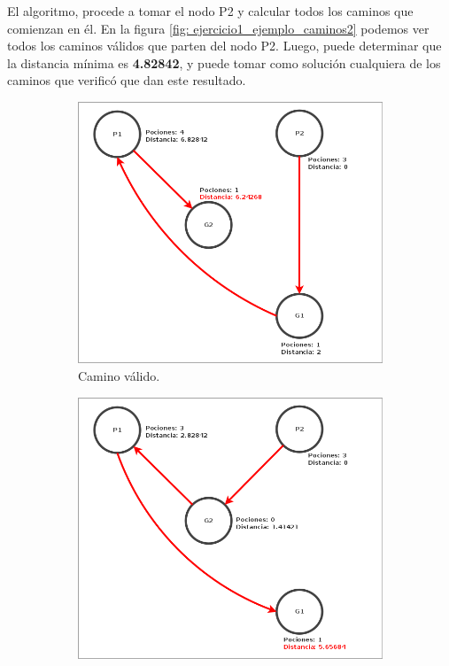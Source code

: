 \par El algoritmo, procede a tomar el nodo P2 y calcular todos los caminos que comienzan en él. En la figura \ref{fig: ejercicio1_ejemplo_caminos2} podemos ver todos los caminos válidos que parten del nodo P2. Luego, puede determinar que la distancia mínima es \textbf{4.82842}, y puede tomar como solución cualquiera de los caminos que verificó que dan este resultado.

\begin{figure}[H]
    \begin{subfigure}[b]{0.49\textwidth}
        \includegraphics[width=\linewidth]{img/ejercicio1/ejercicio1_ejemplo_camino2_1.png}
        \caption{Camino válido.}
        \label{fig: ejercicio1_ejemplo_camino2_1}
    \end{subfigure}
    \begin{subfigure}[b]{0.49\textwidth}
        \includegraphics[width=\linewidth]{img/ejercicio1/ejercicio1_ejemplo_camino2_2.png}

\end{subfigure}
\end{figure}
